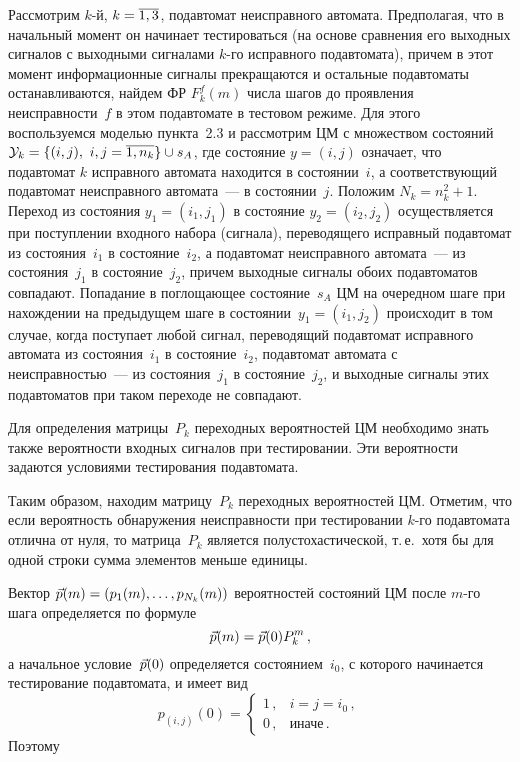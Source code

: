 \begin{multicols}{2}
Рассмотрим $k$-й, $k=\overline{1,3}$, подавтомат неисправного автомата.
Предполагая, что в начальный момент он начинает тестироваться
(на основе сравнения его выходных сигналов с выходными сигналами $k$-го
исправного подавтомата), причем в этот момент информационные сигналы
прекращаются и остальные подавтоматы останавливаются, найдем ФР $F^f_k(m)$
числа шагов до проявления неисправности~$f$ в этом подавтомате в тестовом режиме.
Для этого воспользуемся моделью пункта~2.3 и рассмотрим ЦМ с множеством
состояний ${\cal Y}_k =\{(i,j),\ i,j=\overline{1,n_k}\}\cup s_A$, где состояние
$y=(i,j)$ означает, что подавтомат $k$ исправного автомата
находится в со\-сто\-янии~$i$, а со\-от\-вет\-ст\-ву\-ющий подавтомат неисправного
автомата~--- в со\-сто\-янии~$j$.
Положим $N_k=n_k^2+1$.
Переход из со\-сто\-яния $y_1=(i_1,j_1)$ в со\-сто\-яние $y_2=(i_2,j_2)$
осуществляется при поступлении входного набора (сигнала), переводящего
исправный подавтомат из со\-сто\-яния~$i_1$ в со\-сто\-яние~$i_2$, а подавтомат
неисправного автомата~--- из со\-сто\-яния~$j_1$ в со\-сто\-яние~$j_2$, причем
выходные сигналы обоих подавтоматов совпадают.
Попадание в поглощающее состояние~$s_A$ ЦМ на очередном шаге при нахождении на
предыду\-щем шаге в со\-сто\-янии~$y_1=(i_1,j_2)$ происходит в том случае, когда
поступает любой сигнал, переводящий подавтомат исправного автомата из
со\-сто\-яния~$i_1$ в со\-сто\-яние~$i_2$, подавтомат автомата с неисправностью~---
из со\-сто\-яния~$j_1$ в со\-сто\-яние~$j_2$, и выходные сигналы этих подавтоматов
при таком переходе не совпадают.

 Для определения мат\-ри\-цы~$P_k$ переходных вероятностей ЦМ необходимо
знать также вероятности входных сигналов при тестировании.
Эти вероятности задаются условиями тестирования подавтомата.

Таким образом, находим мат\-ри\-цу~$P_k$ переходных вероятностей ЦМ.
Отметим, что если вероятность обнаружения неисправности при
тестировании\linebreak
$k$-го подавтомата отлична от нуля, то мат\-ри\-ца~$P_k$ является
полустохастической, т.\,е.\ хотя бы для одной строки сумма элементов
меньше единицы.

 Вектор $\vec p(m)=(p_1(m),\ldots,p_{N_k}(m))$ вероятностей состояний ЦМ
после $m$-го шага определяется по формуле
$$
\vec p(m) = \vec p(0) P^m_k\,,
$$
а начальное условие~$\vec p(0)$ определяется со\-сто\-яни\-ем~$i_0$, с которого
начинается тестирование подавтомата, и имеет вид
$$
p_{(i,j)}(0)
=
\begin{cases}
1\,, & i=j=i_0\,, \\
0\,, & \text{иначе}\,.
\end{cases}
$$
Поэтому


\end{multicols}
